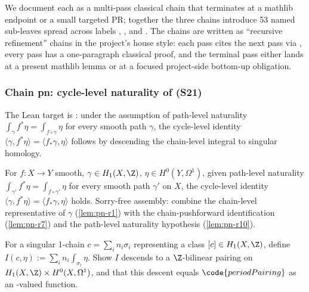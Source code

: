 We document each as a multi-pass classical chain that terminates at a
mathlib endpoint or a small targeted PR; together the three chains
introduce 53 named sub-leaves spread across labels
, , and
. The chains are written as ``recursive
refinement'' chains in the project's house style: each pass cites the
next pass via , every pass has a one-paragraph
classical proof, and the terminal pass either lands at a present
mathlib lemma or at a focused project-side bottom-up obligation.

\subsubsection*{Chain pn: cycle-level naturality of  (S21)}

The Lean target is
: under the
assumption of path-level naturality
$\int_{\gamma}f^{*}\eta = \int_{f\circ\gamma}\eta$ for every smooth path
$\gamma$, the cycle-level identity
$\langle\gamma, f^{*}\eta\rangle = \langle f_{*}\gamma, \eta\rangle$
follows by descending the chain-level integral to singular homology.

\begin{lemma}
\label{lem:pn-r0}
For $f:X\to Y$ smooth, $\gamma\in H_{1}(X,\Z)$, $\eta\in
H^{0}(Y,\Omega^{1})$, given path-level naturality
$\int_{\gamma'}f^{*}\eta=\int_{f\circ\gamma'}\eta$ for every smooth
path $\gamma'$ on $X$, the cycle-level identity
$\langle\gamma,f^{*}\eta\rangle=\langle f_{*}\gamma,\eta\rangle$
holds.  Sorry-free assembly: combine the chain-level representative
of $\gamma$ (\ref{lem:pn-r1}) with the chain-pushforward identification
(\ref{lem:pn-r7}) and the path-level naturality hypothesis
(\ref{lem:pn-r10}).
\leanok
\end{lemma}

\begin{lemma}
\label{lem:pn-r1}
For a singular 1-chain $c=\sum_{i}n_{i}\sigma_{i}$ representing a class
$[c]\in H_{1}(X,\Z)$, define $I(c,\eta):=\sum_{i}n_{i}\int_{\sigma_{i}}\eta$.
Show $I$ descends to a $\Z$-bilinear pairing on $H_{1}(X,\Z)\times
H^{0}(X,\Omega^{1})$, and that this descent equals
$\code{periodPairing}$ as an -valued function.
\leanok
\end{lemma}

